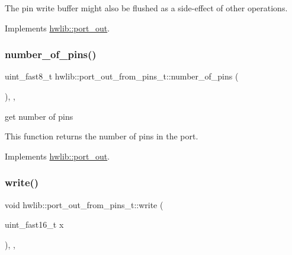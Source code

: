 The pin write buffer might also be flushed as a side-\/effect of other operations. 

Implements \hyperlink{classhwlib_1_1port__out_aff7c8d768ec0b7f3d738a47ef1a4bbfe}{hwlib\+::port\+\_\+out}.

\mbox{\label{classhwlib_1_1port__out__from__pins__t_a781f5e1b62a7489f4e048b7314d84ab6}} 
\subsubsection{\texorpdfstring{number\+\_\+of\+\_\+pins()}{number\_of\_pins()}}
{\footnotesize\ttfamily uint\+\_\+fast8\+\_\+t hwlib\+::port\+\_\+out\+\_\+from\+\_\+pins\+\_\+t\+::number\+\_\+of\+\_\+pins (\begin{DoxyParamCaption}{ }\end{DoxyParamCaption})\hspace{0.3cm}{\ttfamily [inline]}, {\ttfamily [override]}, {\ttfamily [virtual]}}





get number of pins

This function returns the number of pins in the port. 

Implements \hyperlink{classhwlib_1_1port__out_a8593e2ff755b938797defb06c1e085df}{hwlib\+::port\+\_\+out}.

\mbox{\label{classhwlib_1_1port__out__from__pins__t_a8d2a9ecce13e824b305a654675e572e5}} 
\subsubsection{\texorpdfstring{write()}{write()}}
{\footnotesize\ttfamily void hwlib\+::port\+\_\+out\+\_\+from\+\_\+pins\+\_\+t\+::write (\begin{DoxyParamCaption}\item[{uint\+\_\+fast16\+\_\+t}]{x }\end{DoxyParamCaption})\hspace{0.3cm}{\ttfamily [inline]}, {\ttfamily [override]}, {\ttfamily [virtual]}}







